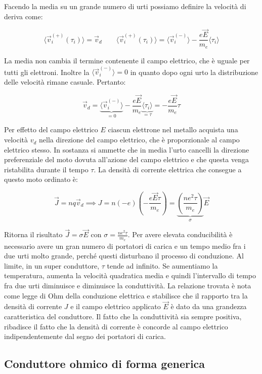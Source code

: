 Facendo la media su un grande numero di urti possiamo definire la velocità di deriva come:

\[
	\langle \vec{v}_i^{(+)} (\tau_i) \rangle = \vec{v}_d \qquad \langle \vec{v}_i^{(+)}(\tau_i) \rangle = \langle \vec{v}_i^{(-)} \rangle - \frac{e\vec{E}}{m_e} \langle \tau_i \rangle
\]

La media non cambia il termine contenente il campo elettrico, che è uguale per tutti gli elettroni. Inoltre la $ \langle \vec{v}_i^{(-)} \rangle = 0 $ in quanto dopo ogni urto la distribuzione delle velocità rimane casuale. Pertanto:

\[
	\vec{v}_d  = \underbrace{\langle \vec{v}_i^{(-)} \rangle}_{=0} - \frac{e\vec{E}}{m_e} \underbrace{\langle \tau_i \rangle}_{=\tau} = - \frac{e\vec{E}}{m_e} \tau
\]

Per effetto del campo elettrico $E$ ciascun elettrone nel metallo acquista una velocità $ v_d  $ nella direzione del campo elettrico, che è proporzionale al campo elettrico stesso. In sostanza si ammette che in media l'urto cancelli la direzione preferenziale del moto dovuta all'azione del campo elettrico e che questa venga ristabilita durante il tempo $\tau$. La densità di corrente elettrica che consegue a questo moto ordinato è:

\[
	\vec{J} =nq\vec{v}_d \implies J = n(-e)\left( -\frac{e\vec{E}\tau}{m_e} \right) = \underbrace{\left( \frac{ne^2 \tau}{m_e} \right)}_{\sigma}  \vec{E}
\]

Ritorna il risultato $ \vec{J} = \sigma \vec{E}  $ con $ \sigma = \frac{ne^2 \tau}{m_e} $.
Per avere elevata conducibilità è necessario avere un gran numero di portatori di carica e un tempo medio fra i due urti molto grande, perché questi disturbano il processo di conduzione. Al limite, in un super conduttore, $\tau$ tende ad infinito.
Se aumentiamo la temperatura, aumenta la velocità quadratica media e quindi l'intervallo di tempo fra due urti diminuisce e diminuisce la conduttività. La relazione trovata è nota come legge di Ohm della conduzione elettrica e stabilisce che il rapporto tra la densità di corrente $J$ e il campo elettrico applicato $\vec{E}$ è dato da una grandezza caratteristica del conduttore. Il fatto che la conduttività sia sempre positiva, ribadisce il fatto che la densità di corrente è concorde al campo elettrico indipendentemente dal segno dei portatori di carica.

\subsection{Conduttore ohmico di forma generica}

